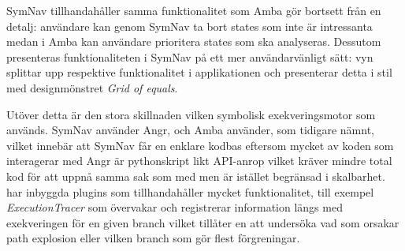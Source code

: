 SymNav tillhandahåller samma funktionalitet som Amba gör bortsett från en
detalj: användare kan genom SymNav ta bort states som inte är intressanta medan
i Amba kan användare prioritera states som ska analyseras. Dessutom presenteras
funktionaliteten i SymNav på ett mer användarvänligt sätt: vyn splittar upp
respektive funktionalitet i applikationen och presenterar detta i stil med
designmönstret \emph{Grid of equals}.

Utöver detta är den stora skillnaden vilken symbolisk exekveringsmotor som
används. SymNav använder Angr, och Amba använder, som tidigare nämnt, \stoe{}
vilket innebär att SymNav får en enklare kodbas eftersom mycket av koden som
interagerar med Angr är pythonskript likt API-anrop vilket kräver mindre total
kod för att uppnå samma sak som med \stoe{} men är istället begränsad i
skalbarhet. \stoe{} har inbyggda plugins som tillhandahåller mycket
funktionalitet, till exempel \emph{ExecutionTracer} som övervakar och
registrerar information längs med exekveringen för en given branch vilket
tillåter en att undersöka vad som orsakar path explosion eller vilken branch som
gör flest förgreningar.
